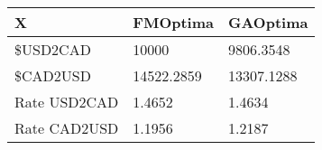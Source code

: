 \begin{tabular}{lll}
X & FMOptima & GAOptima \\ 
\hline 
\$USD2CAD & 10000 & 9806.3548 \\ 
\$CAD2USD & 14522.2859 & 13307.1288 \\ 
Rate USD2CAD & 1.4652 & 1.4634 \\ 
Rate CAD2USD & 1.1956 & 1.2187 \\ 
\hline 
\end{tabular}